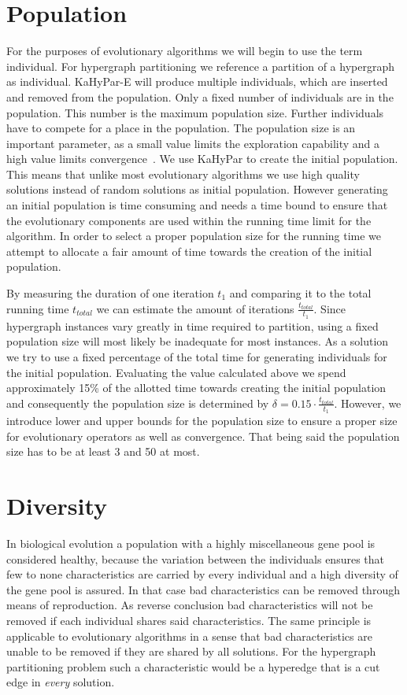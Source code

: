 \documentclass[a4paper,12pt,titlepage, BCOR7mm,headsepline]{scrbook}
\numberwithin{equation}{section}
\begin{document}
\section{Population}
\label{sec:population}
For the purposes of evolutionary algorithms we will begin to use the term individual. For hypergraph partitioning we reference a partition of a hypergraph as individual. KaHyPar-E will produce multiple individuals, which are inserted and removed from the population. Only a fixed number of
individuals are in the population. This number is the maximum population size. Further individuals have to compete for a place in the population. 
The population size is an important parameter, as a small value limits the exploration capability and a high value limits convergence~\cite{chen2012large}.
We use KaHyPar to create the initial population. This means that unlike most evolutionary algorithms we use high quality solutions instead of random solutions as initial population. However generating an initial population is time consuming and needs a time bound to ensure that the evolutionary components are used within the running time limit for the algorithm.
In order to select a proper population size for the running time we attempt to allocate a fair amount of time towards the creation of the initial population. 

By measuring the duration of one iteration $t_1$ and comparing it to the total running time ${t_{total}}$ we can estimate the amount of iterations $\frac{t_{total}}{t_1}$. Since hypergraph instances
vary greatly in time required to partition, using a fixed population size will most likely be inadequate for most instances. As a solution we try to use a fixed percentage of the total time for generating 
individuals for the initial population. Evaluating the value calculated above we spend approximately 15\% of the allotted time towards creating the initial population and consequently the population size is determined by $\delta = 0.15\cdot\frac{t_{total}}{t_1}$.
However, we introduce lower and upper bounds for the population size to ensure a proper size for evolutionary operators as well as convergence. That being said the population size has to be at least 3 and 50 at most.
\section{Diversity}
\label{sec:diversity}
In biological evolution a population with a highly miscellaneous gene pool is considered healthy, because the variation between the individuals ensures that few to none characteristics are carried by every individual and a high diversity of the gene pool is assured. In that case bad characteristics can be removed through means of reproduction. As reverse conclusion bad characteristics will not be removed if each individual shares said characteristics. 
The same principle is applicable to evolutionary algorithms in a sense that bad characteristics are unable to be removed if they are shared by all solutions. For the hypergraph partitioning problem such a characteristic would be a hyperedge that is a cut edge in \emph{every} solution. 
\end{document}
